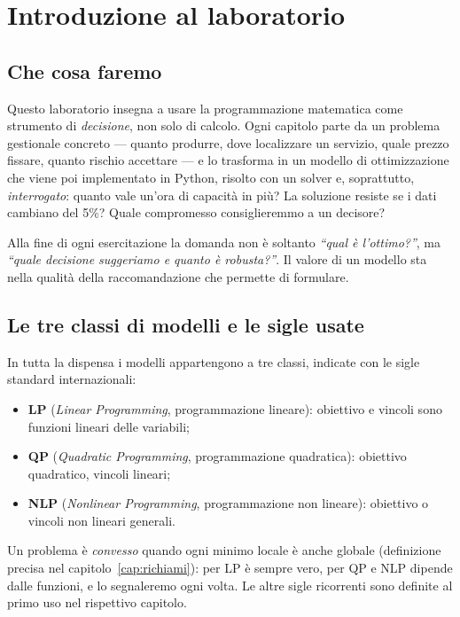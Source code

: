 \chapter{Introduzione al laboratorio}
\label{cap:introduzione}

\section{Che cosa faremo}

Questo laboratorio insegna a usare la programmazione matematica come strumento di
\emph{decisione}, non solo di calcolo. Ogni capitolo parte da un problema gestionale
concreto --- quanto produrre, dove localizzare un servizio, quale prezzo fissare, quanto
rischio accettare --- e lo trasforma in un modello di ottimizzazione che viene poi
implementato in Python, risolto con un solver e, soprattutto, \emph{interrogato}: quanto
vale un'ora di capacità in più? La soluzione resiste se i dati cambiano del 5\%? Quale
compromesso consiglieremmo a un decisore?

\begin{insight}
Alla fine di ogni esercitazione la domanda non è soltanto \emph{``qual è l'ottimo?''},
ma \emph{``quale decisione suggeriamo e quanto è robusta?''}. Il valore di un modello
sta nella qualità della raccomandazione che permette di formulare.
\end{insight}

\section{Le tre classi di modelli e le sigle usate}

In tutta la dispensa i modelli appartengono a tre classi, indicate con le sigle
standard internazionali:

\begin{itemize}
  \item \textbf{LP} (\emph{Linear Programming}, programmazione lineare): obiettivo e
        vincoli sono funzioni lineari delle variabili;
  \item \textbf{QP} (\emph{Quadratic Programming}, programmazione quadratica):
        obiettivo quadratico, vincoli lineari;
  \item \textbf{NLP} (\emph{Nonlinear Programming}, programmazione non lineare):
        obiettivo o vincoli non lineari generali.
\end{itemize}

Un problema è \emph{convesso} quando ogni minimo locale è anche globale (definizione
precisa nel capitolo~\ref{cap:richiami}): per LP è sempre vero, per QP e NLP dipende
dalle funzioni, e lo segnaleremo ogni volta. Le altre sigle ricorrenti sono definite
al primo uso nel rispettivo capitolo.

